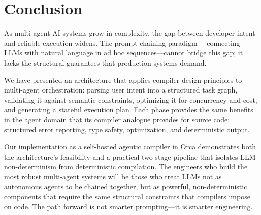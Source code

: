 \documentclass[sigconf,nonacm]{acmart}
\begin{document}
\section{Conclusion}
\label{sec:conclusion}

As multi-agent AI systems grow in complexity, the gap between developer
intent and reliable execution widens. The prompt chaining paradigm---
connecting LLMs with natural language in ad hoc sequences---cannot
bridge this gap; it lacks the structural guarantees that production
systems demand.

We have presented an architecture that applies compiler design
principles to multi-agent orchestration: parsing user intent into a
structured task graph, validating it against semantic constraints,
optimizing it for concurrency and cost, and generating a stateful
execution plan. Each phase provides the same benefits in the agent
domain that its compiler analogue provides for source code:
structured error reporting, type safety, optimization, and
deterministic output.

Our implementation as a self-hosted agentic compiler in Orca
demonstrates both the architecture's feasibility and a practical
two-stage pipeline that isolates LLM non-determinism from deterministic
compilation. The engineers who build the most robust multi-agent systems
will be those who treat LLMs not as autonomous agents to be chained
together, but as powerful, non-deterministic components that require the
same structural constraints that compilers impose on code. The path
forward is not smarter prompting---it is smarter engineering.



\end{document}

